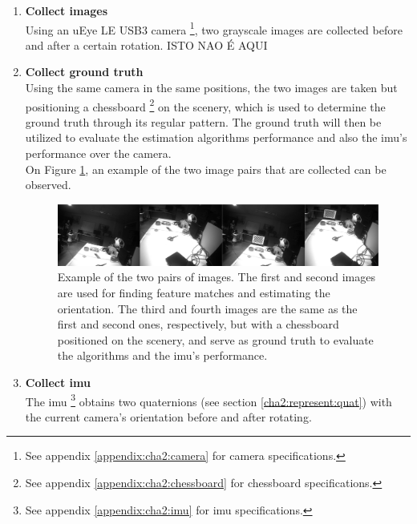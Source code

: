 \begin{enumerate}
	\item \textbf{Collect images}\\
	 Using an uEye LE USB3 camera \footnote{See appendix \ref{appendix:cha2:camera} for camera specifications.}, two grayscale images are collected before and after a certain rotation.
	 ISTO NAO É AQUI
	 
	 \item \textbf{Collect ground truth}\\
	 Using the same camera in the same positions, the two images are taken but positioning a chessboard \footnote{See appendix \ref{appendix:cha2:chessboard} for chessboard specifications.} on the scenery, which is used to determine the ground truth through its regular pattern. The ground truth will then be utilized to evaluate the estimation algorithms performance and also the \acrshort{imu}'s performance over the camera.\\
	 
	 On Figure \ref{cha3:methodology:imagesex}, an example of the two image pairs that are collected can be observed.
	 
\begin{figure}[ht]
	 \centering
	 \includegraphics[width=\textwidth]{images/imagesex.png}
	 \caption[Example of the two pairs of images]{Example of the two pairs of images. The first and second images are used for finding feature matches and estimating the orientation. The third and fourth images are the same as the first and second ones, respectively, but with a chessboard positioned on the scenery, and serve as ground truth to evaluate the algorithms and the \acrshort{imu}'s performance.}
	 \label{cha3:methodology:imagesex}
 \end{figure}
	 
	 \item \textbf{Collect \acrshort{imu}}\\
	 The \acrlong{imu} \footnote{See appendix \ref{appendix:cha2:imu} for \acrshort{imu} specifications.} obtains two quaternions (see section \ref{cha2:represent:quat}) with the current camera's orientation before and after rotating.
	 

\end{enumerate}
